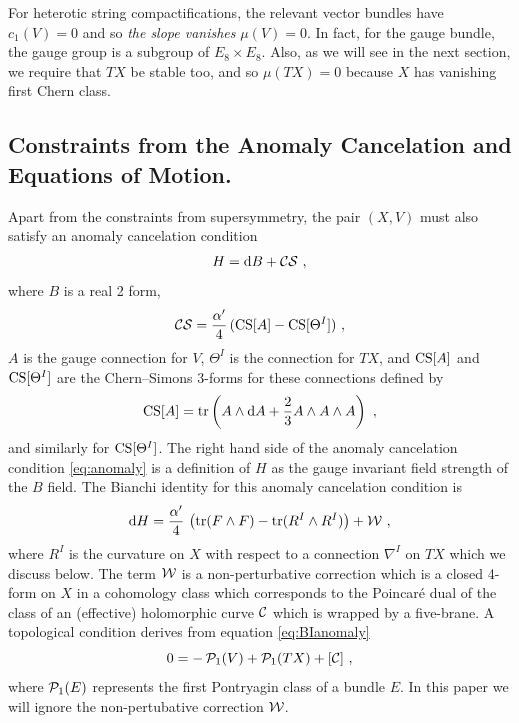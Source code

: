 \documentclass[12pt,a4paper]{article}
\def\d{\textrm{d}}
\def\tr{\textrm{tr}}
\theoremstyle{definition}
\begin{document}
For heterotic string compactifications, the relevant vector bundles have $c_1(V)=0$ and so {\it the slope vanishes} $\mu(V) =0$. In fact, for the gauge bundle, the gauge group is a subgroup of $E_8{\times} E_8$.  Also,
as we will see in the next section, we require that $TX$ be stable too, and so $\mu(TX)=0$ because 
$X$ has vanishing first Chern class. 


\subsection{Constraints from the Anomaly Cancelation and Equations of Motion.}
\label{subsec:anomaly}

Apart from the constraints from supersymmetry, the pair $(X,V)$ must also satisfy an anomaly cancelation condition
\begin{equation}
H = \d B + {\cal C S}~,\label{eq:anomaly}
\end{equation}
where $B$ is a real 2 form, 
\[ {\cal C S} = \frac{\alpha'}{4}\, ({\rm CS}[A] - {\rm CS}[\Theta^I])~,\]
$A$ is the gauge connection for $V$, $\Theta^I$ is the connection for $TX$, and ${\rm CS}[A]$ and ${\rm CS}[\Theta^I]$ are the Chern--Simons 3-forms for these connections defined by
\begin{equation*} 
{\rm CS}[A] = \tr\left(A\wedge\d A + \frac{2}{3} A\wedge A\wedge A\right)~, 
\end{equation*}
and similarly for ${\rm CS}[\Theta^I]$.  The right hand side of the anomaly cancelation condition \eqref{eq:anomaly} is a definition of $H$ as the gauge invariant field strength of the $B$ field. The Bianchi identity for this anomaly cancelation condition is 
\begin{equation}
\d H = \frac{\alpha'}{4}\,\left(\tr (F\wedge F) - \tr (R^I\wedge R^I) \right) + {\cal W}~,\label{eq:BIanomaly}
\end{equation}
where $R^I$ is the curvature on $X$ with respect to a connection $\nabla^I$ on $TX$ which we discuss below.  The term $\cal W$ is a non-perturbative correction which is a closed 4-form on $X$ in a cohomology class which corresponds to the Poincar\'e dual of the class of an (effective) holomorphic curve $\cal{C}$ which is wrapped by a five-brane. 
A topological condition derives from equation \eqref{eq:BIanomaly}  
\begin{equation}
 0 = - \, {\cal P}_1(V) + {\cal P}_1(TX) + [\cal{C}]~,\label{eq:topanomaly}
 \end{equation}
 where ${\cal P}_1(E)$ represents the first Pontryagin class of a bundle $E$.  
In this paper we will ignore the non-pertubative correction $\cal W$.
 
\end{document}
